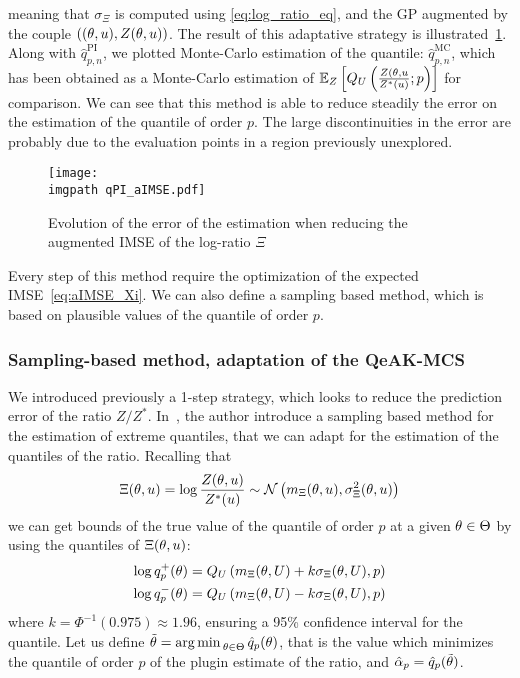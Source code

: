 \documentclass[../../Main_ManuscritThese.tex]{subfiles}
\newcommand\imgpath{/home/victor/acadwriting/Manuscrit/Text/Chapter4/img/}
\begin{document}
meaning that $\sigma_{\Xi}$ is computed using \cref{eq:log_ratio_eq}, and the GP augmented by the couple $\left((\theta, u), Z(\theta, u)\right)$.
The result of this adaptative strategy is illustrated~\cref{fig:qPI_aIMSE}. Along with $\hat{q}_{p,n}^{\mathrm{PI}}$, we plotted Monte-Carlo estimation of the quantile: $\hat{q}_{p,n}^{\mathrm{MC}}$, which has been obtained as a Monte-Carlo estimation of $\mathbb{E}_{Z}\left[Q_{U}\left(\frac{Z(\theta, u}{Z^*(u)};p\right)\right]$ for comparison.
We can see that this method is able to reduce steadily the error on the estimation of the quantile of order $p$. The large discontinuities in the error are probably due to the evaluation points in a region previously unexplored.
\begin{figure}[ht]
  \centering
  \texttt{[image: \\imgpath qPI\_aIMSE.pdf]}
  \caption{\label{fig:qPI_aIMSE} Evolution of the error of the estimation when reducing the augmented IMSE of the log-ratio $\Xi$}
\end{figure}

Every step of this method require the optimization of the expected IMSE~\cref{eq:aIMSE_Xi}. We can also define a sampling based method, which is based on plausible values of the quantile of order $p$.

\subsubsection{Sampling-based method, adaptation of the QeAK-MCS}
We introduced previously a 1-step strategy, which looks to reduce the prediction error of the ratio $Z/Z^*$. In~\cite{razaaly_rare_2019,razaaly_quantile-based_2020}, the author introduce a sampling based method for the estimation of extreme quantiles, that we can adapt for the estimation of the quantiles of the ratio.
Recalling that
\begin{equation}
  \Xi(\theta, u) = \log\frac{Z(\theta, u)}{Z^*(u)} \sim \mathcal{N}\left(m_{\Xi}(\theta, u),\sigma^2_{\Xi}(\theta, u)\right)
\end{equation}
we can get bounds of the true value of the quantile of order $p$ at a given $\theta\in\Theta$ by using the quantiles of $\Xi(\theta, u)$:
\begin{align}
  \log q_p^{+}(\theta) = Q_{U}\left(m_{\Xi}(\theta, U) + k \sigma_{\Xi}(\theta, U), p\right) \\
  \log q_p^{-}(\theta) = Q_{U}\left(m_{\Xi}(\theta, U) - k \sigma_{\Xi}(\theta, U), p\right)
\end{align}
where $k = \Phi^{-1}(0.975)\approx 1.96$, ensuring a 95\% confidence interval for the quantile.
Let us define $\tilde{\theta}=\operatorname*{arg\,min \,}_{\theta \in\Theta} \hat{q}_p(\theta)$, that is the value which minimizes the quantile of order $p$ of the plugin estimate of the ratio, and $\hat{\alpha}_p = \hat{q}_p(\tilde{\theta})$.
\end{document}

